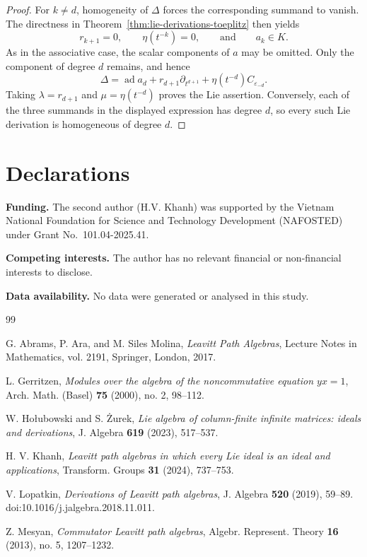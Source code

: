\documentclass[11pt]{article}
\numberwithin{equation}{section}
\theoremstyle{plain}
\theoremstyle{definition}
\numberwithin{equation}{section}
\begin{document}
\begin{proof}
For $k\neq d$, homogeneity of $\Delta$ forces the corresponding summand to vanish. The directness in Theorem~\ref{thm:lie-derivations-toeplitz} then yields
$$
r_{k+1}=0,
\qquad
\eta(t^{-k})=0,
\qquad\text{and}\qquad
a_k\in K.
$$
As in the associative case, the scalar components of $a$ may be omitted. Only the component of degree $d$ remains, and hence
$$
\Delta
=
\operatorname{ad}a_d
+r_{d+1}\partial_{t^{d+1}}
+\eta(t^{-d})C_{\varepsilon_{-d}}.
$$
Taking $\lambda=r_{d+1}$ and $\mu=\eta(t^{-d})$ proves the Lie assertion. Conversely, each of the three summands in the displayed expression has degree $d$, so every such Lie derivation is homogeneous of degree $d$.
\end{proof}
\section*{Declarations}

\noindent\textbf{Funding.}
The second author (H.V. Khanh) was supported by the Vietnam National Foundation for Science and
Technology Development (NAFOSTED) under Grant No.~101.04-2025.41.

\medskip
\noindent\textbf{Competing interests.}
The author has no relevant financial or non-financial interests to disclose.

\medskip
\noindent\textbf{Data availability.}
No data were generated or analysed in this study.

\begin{thebibliography}{99}

G. Abrams, P. Ara, and M. Siles Molina,
\emph{Leavitt Path Algebras},
Lecture Notes in Mathematics, vol. 2191, Springer, London, 2017.

L. Gerritzen,
\emph{Modules over the algebra of the noncommutative equation $yx=1$},
Arch. Math. (Basel) \textbf{75} (2000), no. 2, 98--112.

W. Ho\l{}ubowski and S. \.{Z}urek,
\emph{Lie algebra of column-finite infinite matrices: ideals and derivations},
J. Algebra \textbf{619} (2023), 517--537.

H. V. Khanh,
\emph{Leavitt path algebras in which every Lie ideal is an ideal and applications},
Transform. Groups \textbf{31} (2024), 737--753.

V. Lopatkin,
\emph{Derivations of Leavitt path algebras},
J. Algebra \textbf{520} (2019), 59--89.
doi:10.1016/j.jalgebra.2018.11.011.

Z. Mesyan,
\emph{Commutator Leavitt path algebras},
Algebr. Represent. Theory \textbf{16} (2013), no. 5, 1207--1232.

\end{thebibliography}
\end{document}
